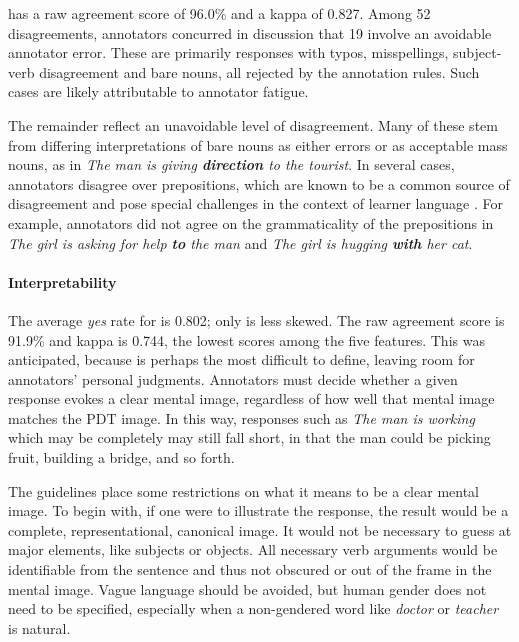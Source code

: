  has a raw agreement score of 96.0\% and a kappa of 0.827. Among 52 disagreements, annotators concurred in discussion that 19 involve an avoidable annotator error. These are primarily responses with typos, misspellings, subject-verb disagreement and bare nouns, all rejected by the annotation rules. Such cases are likely attributable to annotator fatigue.

The remainder reflect an unavoidable level of disagreement. Many of these stem from differing interpretations of bare nouns as either errors or as acceptable mass nouns, as in \textit{The man is giving \textbf{direction} to the tourist}. In several cases, annotators disagree over prepositions, which are known to be a common source of disagreement and pose special challenges in the context of learner language \citep{tetreault-chodorow:2008:HJCL,tetreault:chodorow:08}. For example, annotators did not agree on the grammaticality of the prepositions in \textit{The girl is asking for help \textbf{to} the man} and \textit{The girl is hugging \textbf{with} her cat}. 

\paragraph{Interpretability} The average \textit{yes} rate for  is 0.802; only  is less skewed.
%
The raw agreement score is 91.9\% and kappa is 0.744, the lowest scores among the five features. This was anticipated, because  is perhaps the most difficult to define, leaving room for annotators' personal judgments. Annotators must decide whether a given response evokes a clear mental image, regardless of how well that mental image matches the PDT image.  In this way, responses such as \textit{The man is working} which may %
be completely  may still fall short, in that the man could be picking fruit, building a bridge, and so forth.

The guidelines place some restrictions on what it means to be a clear mental image. To begin with, if one were to illustrate the response, the result would be a complete, representational, canonical image. It would not be necessary to guess at major elements, like subjects or objects. 
%
All necessary verb arguments would be identifiable from the sentence and thus not obscured or out of the frame in the mental image.
%
Vague language should be avoided, but human gender does not need to be specified, especially when a non-gendered word like \textit{doctor} or \textit{teacher} is natural. 

